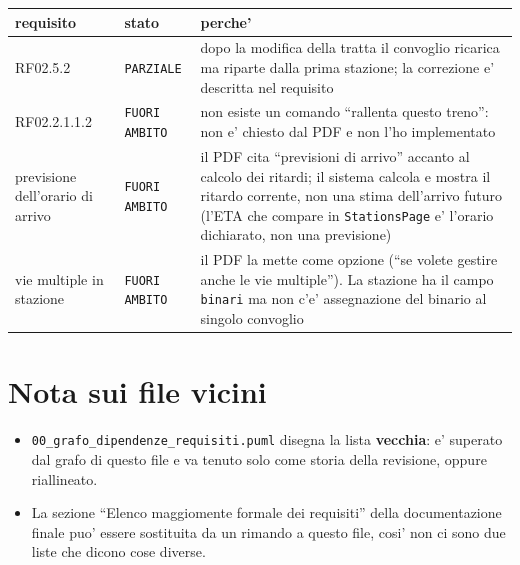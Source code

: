 \documentclass[11pt]{article}
\begin{document}
\begin{center}
\begin{tabular}{lll}
requisito & stato & perche'\\
\hline
RF02.5.2 & \texttt{PARZIALE} & dopo la modifica della tratta il convoglio ricarica ma riparte dalla prima stazione; la correzione e' descritta nel requisito\\
RF02.2.1.1.2 & \texttt{FUORI AMBITO} & non esiste un comando ``rallenta questo treno'': non e' chiesto dal PDF e non l'ho implementato\\
previsione dell'orario di arrivo & \texttt{FUORI AMBITO} & il PDF cita ``previsioni di arrivo'' accanto al calcolo dei ritardi; il sistema calcola e mostra il ritardo corrente, non una stima dell'arrivo futuro (l'ETA che compare in \texttt{StationsPage} e' l'orario dichiarato, non una previsione)\\
vie multiple in stazione & \texttt{FUORI AMBITO} & il PDF la mette come opzione (``se volete gestire anche le vie multiple''). La stazione ha il campo \texttt{binari} ma non c'e' assegnazione del binario al singolo convoglio\\
\end{tabular}
\end{center}
\section{Nota sui file vicini}
\label{sec:org672585e}

\begin{itemize}
\item \texttt{00\_grafo\_dipendenze\_requisiti.puml} disegna la lista \textbf{vecchia}: e' superato dal grafo di questo
file e va tenuto solo come storia della revisione, oppure riallineato.
\item La sezione ``Elenco maggiomente formale dei requisiti'' della documentazione finale puo' essere
sostituita da un rimando a questo file, cosi' non ci sono due liste che dicono cose diverse.
\end{itemize}
\end{document}
